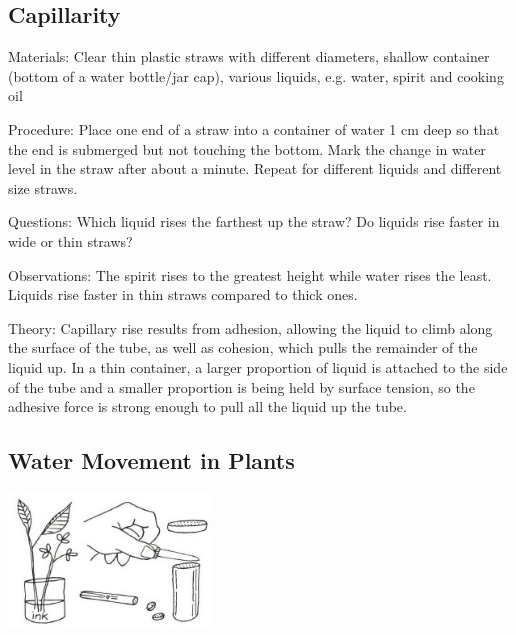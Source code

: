 \begin{multicols}{2}
\subsection{Capillarity}
\begin{description*}
\item[Materials:]{Clear thin plastic straws with different diameters, shallow container (bottom of a water bottle/jar cap), various liquids, e.g. water, spirit and cooking oil}
\item[Procedure:]{Place one end of a straw into a container of water 1 cm deep so that the end is submerged but not touching the bottom. Mark the change in water level in the straw after about a minute. Repeat for different liquids and different size straws.}
\item[Questions:]{Which liquid rises the farthest up the straw? Do liquids rise faster in wide or thin straws?}
\item[Observations:]{The spirit rises to the greatest height while water rises the least. Liquids rise faster in thin straws compared to thick ones.}
\item[Theory:]{Capillary rise results from adhesion, allowing the liquid to climb along the surface of the tube, as well as cohesion, which pulls the remainder of the liquid up. In a thin container, a larger proportion of liquid is attached to the side of the tube and a smaller proportion is being held by surface tension, so the adhesive force is strong enough to pull all the liquid up the tube.}
\end{description*}

\subsection{Water Movement in Plants} %

\begin{center}
\includegraphics[width=0.4\textwidth]{./img/vso/water-movement.jpg}
\end{center}


\end{multicols}
